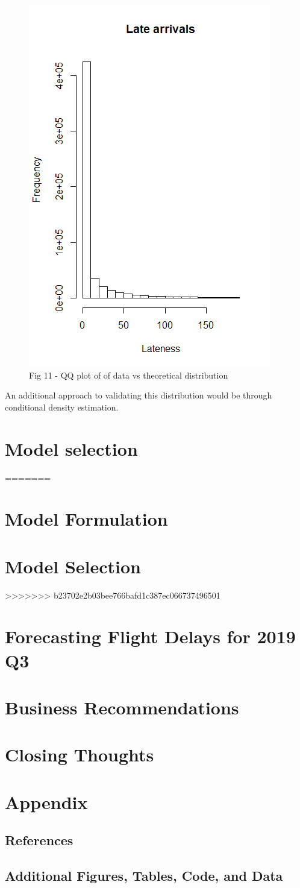 \documentclass[12pt, a4paper]{book}
\newcommand\tab[1][1cm]{\hspace*{#1}}
\begin{document}
			\begin{figure}
			\centering
	 		\includegraphics[width = .45 \textwidth]{../figures/LateArrivalsHistogram}
	 		\caption{Fig 11  - QQ plot of of data vs theoretical distribution}
	 		\end{figure}
	\tab An additional approach to validating this distribution would be through conditional density estimation.
\chapter{Model selection}
=======
\chapter{Model Formulation}
\chapter{Model Selection}
>>>>>>> b23702e2b03bee766bafd1c387ec066737496501
\chapter{Forecasting Flight Delays for 2019 Q3}
\chapter{Business Recommendations}
\chapter{Closing Thoughts}
\chapter{Appendix}
	\section{References}
	\section{Additional Figures, Tables, Code, and Data}
\pagebreak


\nocite{*}

\end{document}
